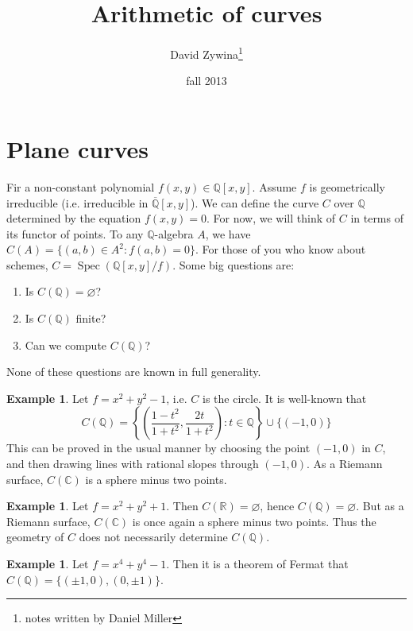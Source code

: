\documentclass{article}
\title{Arithmetic of curves}
\author{David Zywina\thanks{notes written by Daniel Miller}}
\date{fall 2013}
\DeclareMathOperator{\spec}{Spec}
\theoremstyle{definition}
\newtheorem{example}[subsection]{Example}
\begin{document}
\maketitle











\section{Plane curves}

Fir a non-constant polynomial $f(x,y)\in\mathbb{Q}[x,y]$. Assume $f$ is 
geometrically irreducible (i.e. irreducible in $\overline{\mathbb{Q}}[x,y]$). 
We can define the curve $C$ over $\mathbb{Q}$ determined by the equation 
$f(x,y)=0$. For now, we will think of $C$ in terms of its functor of points. 
To any $\mathbb{Q}$-algebra $A$, we have $C(A)=\{(a,b)\in A^2:f(a,b)=0\}$. 
For those of you who know about schemes, 
$C=\spec\left(\mathbb{Q}[x,y]/f\right)$. Some big questions are:
\begin{enumerate}
  \item Is $C(\mathbb{Q})=\varnothing$?
  \item Is $C(\mathbb{Q})$ finite?
  \item Can we compute $C(\mathbb{Q})$?
\end{enumerate}
None of these questions are known in full generality. 

\begin{example}
Let $f=x^2+y^2-1$, i.e. $C$ is the circle. It is well-known that 
\[
  C(\mathbb{Q})=\left\{\left(\frac{1-t^2}{1+t^2},\frac{2t}{1+t^2}\right):t\in\mathbb{Q}\right\}\cup \{(-1,0)\}
\]
This can be proved in the usual manner by choosing the point 
$(-1,0)$ in $C$, and then drawing lines with rational slopes through 
$(-1,0)$. As a Riemann surface, $C(\mathbb{C})$ is a sphere minus 
two points. 
\end{example}

\begin{example}
Let $f=x^2+y^2+1$. Then $C(\mathbb{R})=\varnothing$, hence 
$C(\mathbb{Q})=\varnothing$. But as a Riemann surface, $C(\mathbb{C})$ is 
once again a sphere minus two points. Thus the geometry of $C$ does not 
necessarily determine $C(\mathbb{Q})$. 
\end{example}

\begin{example}
Let $f=x^4+y^4-1$. Then it is a theorem of Fermat that 
$C(\mathbb{Q})=\{(\pm 1,0),(0,\pm 1)\}$.
\end{example}
\end{document}
